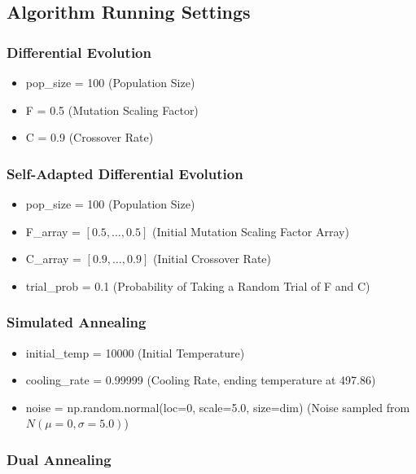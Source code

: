 \documentclass{article}
\begin{document}
\subsection{Algorithm Running Settings}

\subsubsection*{Differential Evolution}

\begin{itemize}
    \item pop\_size = 100 (Population Size)
    \item F = 0.5 (Mutation Scaling Factor)
    \item C = 0.9 (Crossover Rate)
\end{itemize}

\subsubsection*{Self-Adapted Differential Evolution}

\begin{itemize}
    \item pop\_size = 100 (Population Size)
    \item F\_array = $[0.5, \ldots, 0.5]$ (Initial Mutation Scaling Factor Array)
    \item C\_array = $[0.9, \ldots, 0.9]$ (Initial Crossover Rate)
    \item trial\_prob = 0.1 (Probability of Taking a Random Trial of F and C)
\end{itemize}

\subsubsection*{Simulated Annealing}

\begin{itemize}
    \item initial\_temp = 10000 (Initial Temperature)
    \item cooling\_rate = 0.99999 (Cooling Rate, ending temperature at 497.86)
    \item noise = np.random.normal(loc=0, scale=5.0, size=dim) (Noise sampled from $N(\mu=0, \sigma=5.0)$)
\end{itemize}

\subsubsection*{Dual Annealing}
\end{document}
